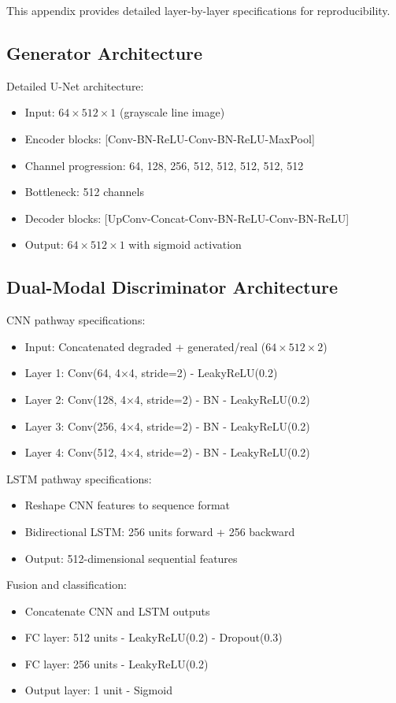 \documentclass[journal]{IEEEtran}
\begin{document}
This appendix provides detailed layer-by-layer specifications for reproducibility.

\subsection{Generator Architecture}

Detailed U-Net architecture:
\begin{itemize}
    \item Input: $64 \times 512 \times 1$ (grayscale line image)
    \item Encoder blocks: [Conv-BN-ReLU-Conv-BN-ReLU-MaxPool]
    \item Channel progression: 64, 128, 256, 512, 512, 512, 512, 512
    \item Bottleneck: 512 channels
    \item Decoder blocks: [UpConv-Concat-Conv-BN-ReLU-Conv-BN-ReLU]
    \item Output: $64 \times 512 \times 1$ with sigmoid activation
\end{itemize}

\subsection{Dual-Modal Discriminator Architecture}

CNN pathway specifications:
\begin{itemize}
    \item Input: Concatenated degraded + generated/real ($64 \times 512 \times 2$)
    \item Layer 1: Conv(64, 4×4, stride=2) - LeakyReLU(0.2)
    \item Layer 2: Conv(128, 4×4, stride=2) - BN - LeakyReLU(0.2)
    \item Layer 3: Conv(256, 4×4, stride=2) - BN - LeakyReLU(0.2)
    \item Layer 4: Conv(512, 4×4, stride=2) - BN - LeakyReLU(0.2)
\end{itemize}

LSTM pathway specifications:
\begin{itemize}
    \item Reshape CNN features to sequence format
    \item Bidirectional LSTM: 256 units forward + 256 backward
    \item Output: 512-dimensional sequential features
\end{itemize}

Fusion and classification:
\begin{itemize}
    \item Concatenate CNN and LSTM outputs
    \item FC layer: 512 units - LeakyReLU(0.2) - Dropout(0.3)
    \item FC layer: 256 units - LeakyReLU(0.2)
    \item Output layer: 1 unit - Sigmoid
\end{itemize}
\end{document}
